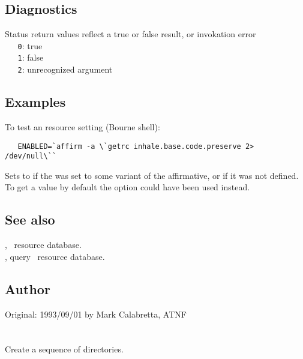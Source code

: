 \subsection*{Diagnostics}

Status return values reflect a true or false result, or invokation error
\\ \verb+   0+: true
\\ \verb+   1+: false
\\ \verb+   2+: unrecognized argument

\subsection*{Examples}

To test an  resource setting (Bourne shell):

\begin{verbatim}
   ENABLED=`affirm -a \`getrc inhale.base.code.preserve 2> /dev/null\``
\end{verbatim}

\noindent
Sets  to  if the  was
set to some variant of the affirmative, or if it was not defined.  To get a
 value by default the  option could have been used
instead.

\subsection*{See also}

, \aipspp\ resource database.\\
, query \aipspp\ resource database.

\subsection*{Author}

Original: 1993/09/01 by Mark Calabretta, ATNF


\newpage
\section{}
\label{amkdir}

Create a sequence of directories.

